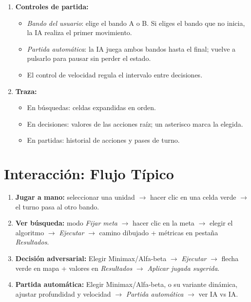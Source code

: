 \begin{enumerate}
\begin{itemize}
    \item \textit{Aplicar jugada}: Juega la acción devuelta por Minimax/$\alpha$-$\beta$.
    \item \textit{Reiniciar}: Regresa al estado inicial del escenario.
    \end{itemize}
\item \textbf{Controles de partida:}
    \begin{itemize}
    \item \textit{Bando del usuario}: elige el bando A o B. Si eliges el bando que no inicia, la IA realiza el primer movimiento.
    \item \textit{Partida automática}: la IA juega ambos bandos hasta el final; vuelve a pulsarlo
      para pausar sin perder el estado.
    \item El control de velocidad regula el intervalo entre decisiones.
    \end{itemize}
\item \textbf{Traza:}
    \begin{itemize}
    \item En búsquedas: celdas expandidas en orden.
    \item En decisiones: valores de las acciones raíz; un asterisco marca la elegida.
    \item En partidas: historial de acciones y pases de turno.
    \end{itemize}
\end{enumerate}

\section{Interacción: Flujo Típico}
\label{sec:gui-flujo}

\begin{enumerate}
\item \textbf{Jugar a mano:} seleccionar una unidad $\to$ hacer clic en una celda verde $\to$ el turno pasa al otro bando.
\item \textbf{Ver búsqueda:} modo \textit{Fijar meta} $\to$ hacer clic en la meta $\to$ elegir el algoritmo $\to$
  \textit{Ejecutar} $\to$ camino dibujado + métricas en pestaña \textit{Resultados}.
\item \textbf{Decisión adversarial:} Elegir Minimax/Alfa-beta $\to$ \textit{Ejecutar} $\to$
  flecha verde en mapa + valores en \textit{Resultados} $\to$ \textit{Aplicar jugada sugerida}.
\item \textbf{Partida automática:} Elegir Minimax/Alfa-beta, o su variante dinámica, ajustar
  profundidad y velocidad $\to$ \textit{Partida automática} $\to$ ver IA vs IA.
\end{enumerate}

